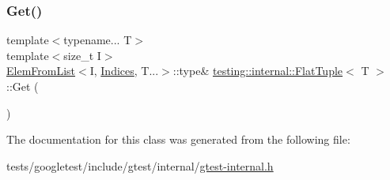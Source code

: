 \subsubsection{\texorpdfstring{Get()}{Get()}\hspace{0.1cm}{\footnotesize\ttfamily [2/2]}}
{\footnotesize\ttfamily template$<$typename... T$>$ \\
template$<$size\+\_\+t I$>$ \\
\hyperlink{structtesting_1_1internal_1_1ElemFromList}{Elem\+From\+List}$<$I, \hyperlink{classtesting_1_1internal_1_1FlatTuple_a004b42fc11ac1a85a9b1560fa83cdf77}{Indices}, T...$>$\+::type\& \hyperlink{classtesting_1_1internal_1_1FlatTuple}{testing\+::internal\+::\+Flat\+Tuple}$<$ T $>$\+::Get (\begin{DoxyParamCaption}{ }\end{DoxyParamCaption})\hspace{0.3cm}{\ttfamily [inline]}}



The documentation for this class was generated from the following file\+:\begin{DoxyCompactItemize}
\item 
tests/googletest/include/gtest/internal/\hyperlink{gtest-internal_8h}{gtest-\/internal.\+h}\end{DoxyCompactItemize}
